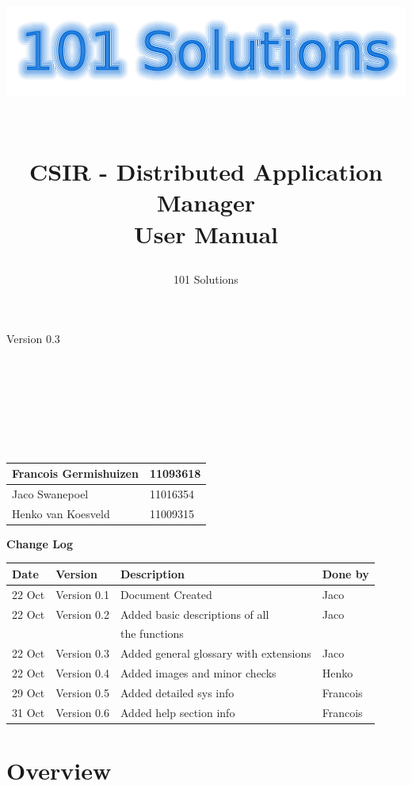 \documentclass[a4paper,12pt,final]{article}
\title{
\begin{center}
  	\includegraphics[scale=0.3]{101Logo.png} 
  \end{center}
  \textbf{\\}
CSIR - Distributed Application Manager\\
User Manual\\
}
\author{101 Solutions}
\begin{document}
\maketitle
\begin{center}
Version 0.3
\end{center}
\textbf{\\}
\textbf{\\}
\textbf{\\}
\textbf{\\}
\textbf{\\}
\textbf{\\}
\begin{center}
\begin{tabular}{|l|l|}
\hline
Francois Germishuizen & 11093618\\
\hline
Jaco Swanepoel & 11016354\\
\hline
Henko van Koesveld & 11009315\\
\hline
\end{tabular}
\end{center}
\thispagestyle{empty}
\newpage
\thispagestyle{empty}
\textbf{\large{Change Log}}
\vspace{6pt}\newline
\begin{tabular}{|l|l|l|l|}
\hline
\textbf{Date} & \textbf{Version} & \textbf{Description} & \textbf{Done by}\\
\hline
22 Oct & Version 0.1 & Document Created & Jaco\\
\hline
22 Oct & Version 0.2 & Added basic descriptions of all  & Jaco\\
&&the functions&\\
\hline
22 Oct & Version 0.3 & Added general glossary with extensions & Jaco\\
\hline
22 Oct & Version 0.4 & Added images and minor checks  & Henko\\
\hline
29 Oct & Version 0.5 & Added detailed sys info  & Francois\\
\hline
31 Oct & Version 0.6 & Added help section info  & Francois\\
\hline
\end{tabular}
\newpage
\tableofcontents
\thispagestyle{empty}
\newpage

\section{Overview}
\end{document}
